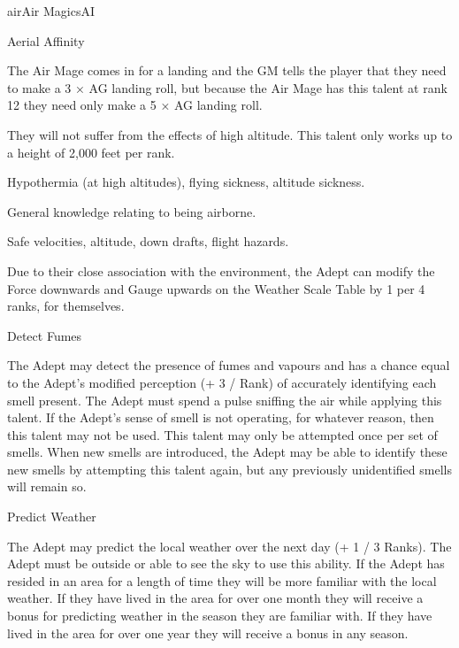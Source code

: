 \begin{College}[2.1]{air}{Air Magics}{AI}
\begin{talent}[T-1]{Aerial Affinity}
\begin{effects}
\begin{Enumerate}
\begin{example}
The Air Mage comes in for a landing and the GM tells the player that
they need to make a 3 × AG landing roll, but because the Air Mage has
this talent at rank 12 they need only make a 5 × AG landing roll.
\end{example}

\item They will not suffer from the effects of high altitude.  This
  talent only works up to a height of 2,000 feet per rank.

\begin{example} 
Hypothermia (at high altitudes), flying sickness, altitude sickness.
\end{example}

\item General knowledge relating to being airborne. 
\begin{example}
Safe velocities, altitude, down drafts, flight hazards.
\end{example}

\item Due to their close association with the environment, the Adept
  can modify the Force downwards and Gauge upwards on the Weather
  Scale Table by 1 per 4 ranks, for themselves.
\end{Enumerate}
\end{effects}
\end{talent}

\begin{talent}[T-2]{Detect Fumes}

\begin{effects}
The Adept may detect the presence of fumes and vapours and has a
chance equal to the Adept’s modified perception (+ 3 / Rank) of
accurately identifying each smell present.  The Adept must spend a
pulse sniffing the air while applying this talent.  If the Adept’s
sense of smell is not operating, for whatever reason, then this talent
may not be used.  This talent may only be attempted once per set of
smells. When new smells are introduced, the Adept may be able to
identify these new smells by attempting this talent again, but any
previously unidentified smells will remain so.
\end{effects}
\end{talent}

\begin{talent}[T-3]{Predict Weather}

\begin{effects}
The Adept may predict the local weather over the next day (+ 1 / 3
Ranks). The Adept must be outside or able to see the sky to use this
ability.  If the Adept has resided in an area for a length of time
they will be more familiar with the local weather. If they have lived
in the area for over one month they will receive a bonus for
predicting weather in the season they are familiar with. If they have
lived in the area for over one year they will receive a bonus in any
season.


\end{effects}
\end{talent}
\end{College}
